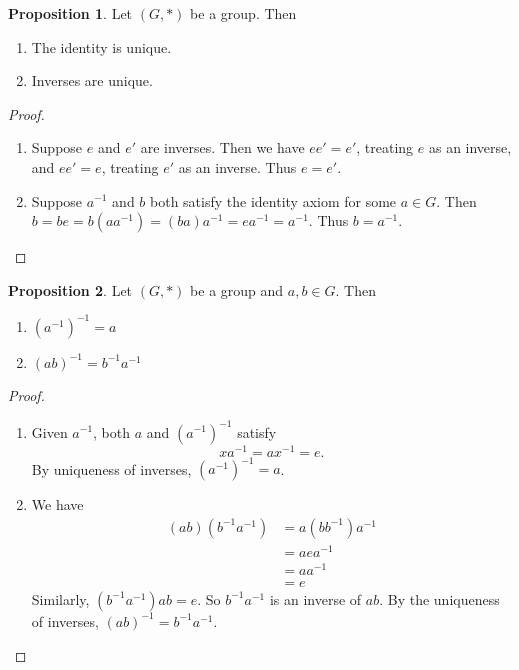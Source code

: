 \documentclass[a4paper]{article}
\theoremstyle{definition}
\newtheorem*{prop}{Proposition}
\begin{document}
\begin{prop}
  Let $(G, *)$ be a group. Then
  \begin{enumerate}
  \item The identity is unique.
  \item Inverses are unique.
  \end{enumerate}
\end{prop}
\begin{proof}\leavevmode
  \begin{enumerate}[label=(\roman{*})]
  \item Suppose $e$ and $e'$ are inverses. Then we have $ee' = e'$, treating $e$ as an inverse, and $ee' = e$, treating $e'$ as an inverse. Thus $e = e'$.
  \item Suppose $a^{-1}$ and $b$ both satisfy the identity axiom for some $a\in G$. Then $b = be = b(aa^{-1}) = (ba)a^{-1} = ea^{-1} = a^{-1}$. Thus $b = a^{-1}$.
  \end{enumerate}
\end{proof}
\begin{prop}
  Let $(G, *)$ be a group and $a, b\in G$. Then
  \begin{enumerate}
  \item $(a^{-1})^{-1} = a$
  \item $(ab)^{-1} = b^{-1}a^{-1}$
  \end{enumerate}
\end{prop}
\begin{proof}\leavevmode
  \begin{enumerate}
  \item Given $a^{-1}$, both $a$ and  $(a^{-1})^{-1}$ satisfy
    \[
    xa^{-1} = ax^{-1} = e.
    \]
    By uniqueness of inverses, $(a^{-1})^{-1} = a$.
  \item We have
    \begin{align*}
      (ab)(b^{-1}a^{-1}) &= a(bb^{-1})a^{-1} \\
      &= aea^{-1}\\
      &= aa^{-1}\\
      &= e
    \end{align*}
    Similarly, $(b^{-1}a^{-1})ab = e$. So $b^{-1}a^{-1}$ is an inverse of $ab$. By the uniqueness of inverses, $(ab)^{-1} = b^{-1}a^{-1}$.
  \end{enumerate}
\end{proof}
\end{document}
